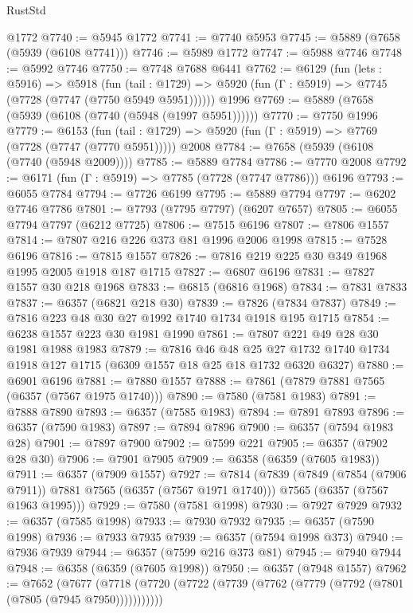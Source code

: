 \begin{lexlean}{RustStd}
\begin{coremodule}
    @1772
@7740 := @5945 @1772
@7741 := @7740 @5953
@7745 := @5889 (@7658 (@5939 (@6108 @7741)))
@7746 := @5989 @1772
@7747 := @5988 @7746
@7748 := @5992 @7746
@7750 := @7748 @7688 @6441
@7762 := @6129
    (fun (lets : @5916) =>
    @5918
      (fun (tail : @1729) => @5920 (fun (Γ : @5919) => @7745 (@7728 (@7747 (@7750 @5949 @5951))))))
    @1996
@7769 := @5889 (@7658 (@5939 (@6108 (@7740 (@5948 (@1997 @5951))))))
@7770 := @7750 @1996
@7779 := @6153
    (fun (tail : @1729) => @5920 (fun (Γ : @5919) => @7769 (@7728 (@7747 (@7770 @5951)))))
    @2008
@7784 := @7658 (@5939 (@6108 (@7740 (@5948 @2009))))
@7785 := @5889 @7784
@7786 := @7770 @2008
@7792 := @6171 (fun (Γ : @5919) => @7785 (@7728 (@7747 @7786))) @6196
@7793 := @6055 @7784
@7794 := @7726 @6199
@7795 := @5889 @7794
@7797 := @6202 @7746 @7786
@7801 := @7793 (@7795 @7797) (@6207 @7657)
@7805 := @6055 @7794 @7797 (@6212 @7725)
@7806 := @7515 @6196
@7807 := @7806 @1557
@7814 := @7807 @216 @226 @373 @81 @1996 @2006 @1998
@7815 := @7528 @6196
@7816 := @7815 @1557
@7826 := @7816 @219 @225 @30 @349 @1968 @1995 @2005 @1918 @187 @1715
@7827 := @6807 @6196
@7831 := @7827 @1557 @30 @218 @1968
@7833 := @6815 (@6816 @1968)
@7834 := @7831 @7833
@7837 := @6357 (@6821 @218 @30)
@7839 := @7826 (@7834 @7837)
@7849 := @7816 @223 @48 @30 @27 @1992 @1740 @1734 @1918 @195 @1715
@7854 := @6238 @1557 @223 @30 @1981 @1990
@7861 := @7807 @221 @49 @28 @30 @1981 @1988 @1983
@7879 := @7816
    @46
    @48
    @25
    @27
    @1732
    @1740
    @1734
    @1918
    @127
    @1715
    (@6309 @1557 @18 @25 @18 @1732 @6320 @6327)
@7880 := @6901 @6196
@7881 := @7880 @1557
@7888 := @7861 (@7879 @7881 @7565 (@6357 (@7567 @1975 @1740)))
@7890 := @7580 (@7581 @1983)
@7891 := @7888 @7890
@7893 := @6357 (@7585 @1983)
@7894 := @7891 @7893
@7896 := @6357 (@7590 @1983)
@7897 := @7894 @7896
@7900 := @6357 (@7594 @1983 @28)
@7901 := @7897 @7900
@7902 := @7599 @221
@7905 := @6357 (@7902 @28 @30)
@7906 := @7901 @7905
@7909 := @6358 (@6359 (@7605 @1983))
@7911 := @6357 (@7909 @1557)
@7927 := @7814
    (@7839
      (@7849 (@7854 (@7906 @7911)) @7881 @7565 (@6357 (@7567 @1971 @1740)))
      @7565
      (@6357 (@7567 @1963 @1995)))
@7929 := @7580 (@7581 @1998)
@7930 := @7927 @7929
@7932 := @6357 (@7585 @1998)
@7933 := @7930 @7932
@7935 := @6357 (@7590 @1998)
@7936 := @7933 @7935
@7939 := @6357 (@7594 @1998 @373)
@7940 := @7936 @7939
@7944 := @6357 (@7599 @216 @373 @81)
@7945 := @7940 @7944
@7948 := @6358 (@6359 (@7605 @1998))
@7950 := @6357 (@7948 @1557)
@7962 := @7652
    (@7677 (@7718 (@7720 (@7722 (@7739 (@7762 (@7779 (@7792 (@7801 (@7805 (@7945 @7950)))))))))))

\end{coremodule}
\end{lexlean}
